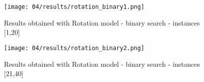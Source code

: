   \begin{figure}[H]
    \centering
    \texttt{[image: 04/results/rotation\_binary1.png]}
    \caption{
      Results obtained with Rotation model - binary search - instances [1,20]
    }
    \label{fig:SAT_results_rotation_binary1}
  \end{figure}

  \begin{figure}[H]
    \centering
    \texttt{[image: 04/results/rotation\_binary2.png]}
    \caption{
      Results obtained with Rotation model - binary search - instances [21,40]
    }
    \label{fig:SAT_results_rotation_binary2}


  \end{figure}